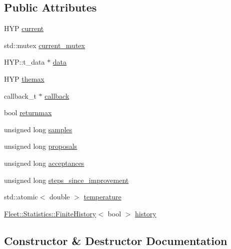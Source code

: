 \subsection*{Public Attributes}
\begin{DoxyCompactItemize}
\item 
H\+YP \hyperlink{class_m_c_m_c_chain_ab0c3b31e96d1f703bb8cf55c0575b4bd}{current}
\item 
std\+::mutex \hyperlink{class_m_c_m_c_chain_a42c355121fce0476426a49d5498c38a1}{current\+\_\+mutex}
\item 
H\+Y\+P\+::t\+\_\+data $\ast$ \hyperlink{class_m_c_m_c_chain_a62ffa9a3d173a79c82f09174b58aebaf}{data}
\item 
H\+YP \hyperlink{class_m_c_m_c_chain_a966ec00d236d4df6c477c6fd5575fd87}{themax}
\item 
callback\+\_\+t $\ast$ \hyperlink{class_m_c_m_c_chain_aa7a4a0d46ae2d9818c2f076f839badd7}{callback}
\item 
bool \hyperlink{class_m_c_m_c_chain_ad51e645f9de68d3f008b62ada6375099}{returnmax}
\item 
unsigned long \hyperlink{class_m_c_m_c_chain_a0d3ac649b04077cd0ffea236df560c91}{samples}
\item 
unsigned long \hyperlink{class_m_c_m_c_chain_aec2cdd6a3e25447c7f34e31d0d98dbcb}{proposals}
\item 
unsigned long \hyperlink{class_m_c_m_c_chain_ae1597e42074b2efb93ace3e40f1f7a45}{acceptances}
\item 
unsigned long \hyperlink{class_m_c_m_c_chain_aeac1cd63d13c397ba01cca35b605b786}{steps\+\_\+since\+\_\+improvement}
\item 
std\+::atomic$<$ double $>$ \hyperlink{class_m_c_m_c_chain_a7173287e1c0e681a9912a84c87320ece}{temperature}
\item 
\hyperlink{class_fleet_1_1_statistics_1_1_finite_history}{Fleet\+::\+Statistics\+::\+Finite\+History}$<$ bool $>$ \hyperlink{class_m_c_m_c_chain_a2595f417e0c9cc847ac1dd70ed8b0763}{history}
\end{DoxyCompactItemize}


\subsection{Constructor \& Destructor Documentation}
\mbox{\label{class_m_c_m_c_chain_a60b036bec195eaa5a8081b2b8cc18eed}} 
